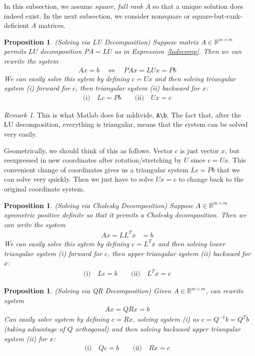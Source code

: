 \documentclass[12pt]{book}
\numberwithin{equation}{section} %
\theoremstyle{plain}
\newtheorem{prop}[thm]{Proposition}
\theoremstyle{definition}
\theoremstyle{remark}
\newtheorem*{rmk}{Remark}
\newcommand{\Rmm}{\mathbb{R}^{m\times m}}
\begin{document}
In this subsection, we assume \emph{square}, \emph{full rank} $A$
so that a unique solution does indeed exist. In the next
subsection, we consider nonsquare or square-but-rank-deficient $A$
matrices.

\begin{prop}\emph{(Solving via LU Decomposition)}
Suppose matrix $A\in\Rmm$ permits $LU$ decomposition $PA = LU$ as in
Expression~\ref{ludecomp}.
Then we can rewrite the system
\begin{align*}
  Ax = b
  \quad\iff\quad
  PAx = LUx = Pb
\end{align*}
We can easily solve this sytem by defining $c=Ux$ and then solving
triangular system (i) forward for $c$, then triangular system (ii)
backward for $x$:
\begin{align*}
  \text{(i)}\quad Lc = Pb
  \qquad
  \text{(ii)}\quad Ux = c
\end{align*}
\end{prop}
\begin{rmk}
This is what Matlab does for mldivide, \texttt{A\textbackslash b}.
The fact that, after the LU decomposition, everything is triangular,
means that the system can be solved very easily.

Geometrically, we should think of this as follows. Vector $c$ is just
vector $x$, but reexpressed in new coordinates after rotation/stretching
by $U$ since $c=Ux$. This convenient change of coordinates gives us a
triangular system $Lc = Pb$ that we can solve very quickly. Then we just
have to solve $Ux = c$ to change back to the original coordinate system.
\end{rmk}

\begin{prop}\emph{(Solving via Cholesky Decomposition)}
Suppose $A\in\Rmm$ symmetric positive definite so that it permits a
Cholesky decomposition. Then we can write the system
\begin{align*}
  Ax = LL^Tx&=b
\end{align*}
We can easily solve this sytem by defining $c=L^Tx$ and then solving
lower triangular system (i) forward for $c$, then upper triangular
system (ii) backward for $x$:
\begin{align*}
  \text{(i)}\quad Lc = b
  \qquad
  \text{(ii)}\quad L^Tx = c
\end{align*}
\end{prop}

\begin{prop}\emph{(Solving via QR Decomposition)}
Given $A\in\Rmm$, can rewrite system
\begin{align*}
  Ax = QRx = b
\end{align*}
Can easily solve system by defining $c=Rx$,
solving system (i) as $c=Q^{-1}b=Q^Tb$ (taking advantage of
$Q$ orthogonal) and then solving backward upper triangular system
(ii) for $x$:
\begin{align*}
  \text{(i)}\quad
  Qc = b
  \qquad
  \text{(ii)}\quad
  Rx = c
\end{align*}
\end{prop}
\end{document}

